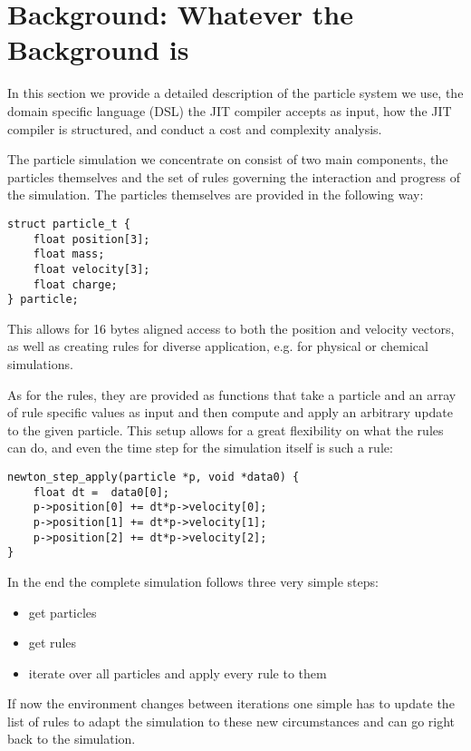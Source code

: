 \section{Background: Whatever the Background is}\label{sec:background}

In this section we provide a detailed description of the particle system we use, the domain specific language (DSL) the JIT compiler accepts as input, how the JIT compiler is structured, and conduct a cost and complexity analysis.

The particle simulation we concentrate on consist of two main components, the particles themselves and the set of rules governing the interaction and progress of the simulation. The particles themselves are provided in the following way:
\begin{lstlisting}
struct particle_t {
    float position[3];
    float mass;
    float velocity[3];
    float charge;
} particle;
\end{lstlisting}

This allows for 16 bytes aligned access to both the position and velocity vectors, as well as creating rules for diverse application, e.g. for physical or chemical simulations.

As for the rules, they are provided as functions that take a particle and an array of rule specific values as input and then compute and apply an arbitrary update to the given particle. This setup allows for a great flexibility on what the rules can do, and even the time step for the simulation itself is such a rule:

\begin{lstlisting}
newton_step_apply(particle *p, void *data0) {
    float dt =  data0[0];
    p->position[0] += dt*p->velocity[0];
    p->position[1] += dt*p->velocity[1];
    p->position[2] += dt*p->velocity[2];
}
\end{lstlisting}

In the end the complete simulation follows three very simple steps:
\begin{itemize}
\item get particles
\item get rules
\item iterate over all particles and apply every rule to them
\end{itemize}

If now the environment changes between iterations one simple has to update the list of rules to adapt the simulation to these new circumstances and can go right back to the simulation.

